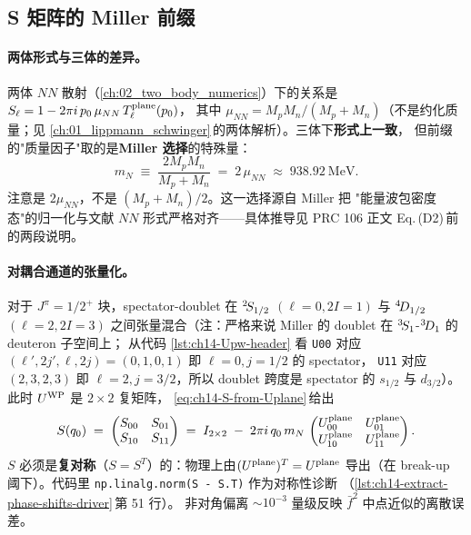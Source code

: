 \subsection{S 矩阵的 Miller 前缀}
\label{subsec:ch14-S-prefactor}

\paragraph{两体形式与三体的差异。}
两体 \(NN\) 散射（\cref{ch:02_two_body_numerics}）下的关系是
\(S_{\ell} = 1 - 2\pi i\, p_0\, \mu_{NN}\, T^{\rm plane}_{\ell}(p_0)\)，
其中 \(\mu_{NN} = M_p M_n / (M_p + M_n)\)（不是约化质量；见
\cref{ch:01_lippmann_schwinger}\(\,\)的两体解析）。三体下\textbf{形式上一致}，
但前缀的"质量因子"取的是\textbf{Miller 选择}的特殊量：
\begin{equation}
\label{eq:ch14-MN-Miller}
m_N \;\equiv\; \frac{2 M_p M_n}{M_p + M_n}
\;=\; 2\,\mu_{NN}
\;\approx\; 938.92~\text{MeV}.
\end{equation}
注意是 \(2 \mu_{NN}\)，不是 \((M_p + M_n)/2\)。这一选择源自 Miller 把
"能量波包密度态"的归一化与文献 \(NN\) 形式严格对齐——具体推导见 PRC 106
正文 Eq.\,(D2)\(\,\)前的两段说明。

\paragraph{对耦合通道的张量化。}
对于 \(J^\pi = 1/2^+\) 块，spectator-doublet 在 \({}^{2}\!S_{1/2}\)
\((\ell = 0, 2I = 1)\) 与 \({}^{4}\!D_{1/2}\) \((\ell = 2, 2I = 3)\)
之间张量混合（注：严格来说 Miller 的 doublet 在
\({}^{3}\!S_{1}\)-\({}^{3}\!D_{1}\) 的 deuteron 子空间上；
从代码 \cref{lst:ch14-Upw-header} 看 \texttt{U00} 对应
\((\ell',2j',\ell,2j) = (0,1,0,1)\) 即 \(\ell=0, j=1/2\) 的 spectator，
\texttt{U11} 对应 \((2,3,2,3)\) 即 \(\ell=2, j=3/2\)，所以 doublet
跨度是 spectator 的 \(s_{1/2}\) 与 \(d_{3/2}\)）。
此时 \(U^{\rm WP}\) 是 \(2 \times 2\) 复矩阵，
\cref{eq:ch14-S-from-Uplane}\(\,\)给出
\begin{equation}
\label{eq:ch14-S-2x2}
S(q_0)
\;=\;
\begin{pmatrix}
S_{00} & S_{01} \\ S_{10} & S_{11}
\end{pmatrix}
\;=\;
I_{2\times 2}
\;-\;
2\pi i\, q_0\, m_N\,
\begin{pmatrix}
U^{\rm plane}_{00} & U^{\rm plane}_{01} \\
U^{\rm plane}_{10} & U^{\rm plane}_{11}
\end{pmatrix}.
\end{equation}
\(S\) 必须是\textbf{复对称}（\(S = S^T\)）的：物理上由\((U^{\rm plane})^T =
U^{\rm plane}\) 导出（在 break-up 阈下）。代码里
\verb|np.linalg.norm(S - S.T)| 作为对称性诊断
（\cref{lst:ch14-extract-phase-shifts-driver}\(\,\)第 51 行）。
非对角偏离 \(\sim 10^{-3}\) 量级反映 \(\bar{f}^2\) 中点近似的离散误差。

